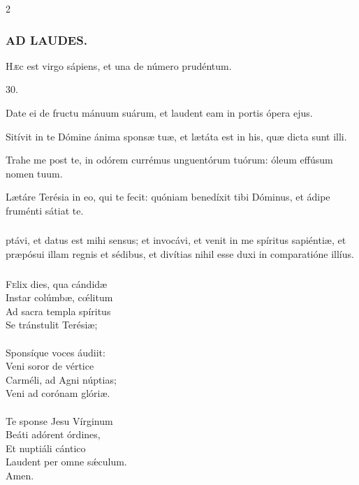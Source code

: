 \documentclass[9pt,twoside]{extarticle}
\begin{document}
\begin{multicols}{2}
\subsubsection*{\center \textsc{AD LAUDES.}}
\begin{center}\end{center}
\lettrine{H}æc est virgo sápiens, et una de número prudéntum. 

\begin{tightlist}{}
\item {} 30.
\item {} Date ei de fructu mánuum suárum, et laudent eam in portis ópera ejus.
\item {} Sitívit in te Dómine ánima sponsæ tuæ, et lætáta est in his, quæ dicta sunt illi.
\item {} Trahe me post te, in odórem currémus unguentórum tuórum: óleum effúsum nomen tuum.
\item {} Lætáre Terésia in eo, qui te fecit: quóniam benedíxit tibi Dóminus, et ádipe fruménti sátiat te.
\end{tightlist}

\subsubsection*{\center {}}
ptávi, et datus est mihi sensus; et invocávi, et venit in me spíritus sapiéntiæ, et præpósui illam regnis et sédibus, et divítias nihil esse duxi in comparatióne illíus.

\subsubsection*{\center {}}
\begin{center}\end{center}
\lettrine{F}elix dies, qua cándidæ\\
Instar colúmbæ, cœ́litum\\
Ad sacra templa spíritus\\
Se tránstulit Terésiæ;\\
\\
Sponsíque voces áudiit:\\
Veni soror de vértice\\
Carméli, ad Agni núptias;\\
Veni ad corónam glóriæ.\\
\\
Te sponse Jesu Vírginum\\
Beáti adórent órdines,\\
Et nuptiáli cántico\\
Laudent per omne sǽculum.\\
Amen.


\end{multicols}
\end{document}
